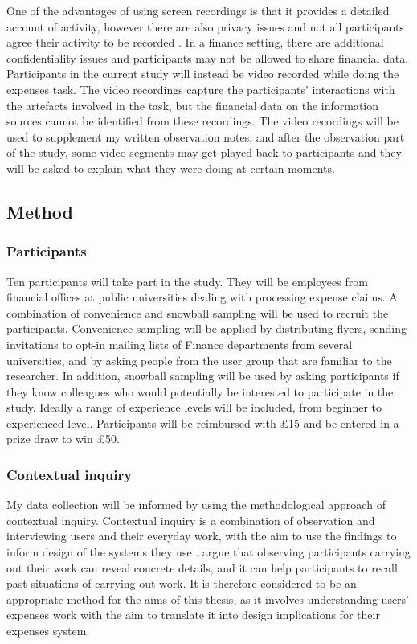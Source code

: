 \documentclass[11pt,oneside]{report}
\begin{document}
One of the advantages of using screen recordings is that it provides a detailed account of activity, however there are also privacy issues and not all participants agree their activity to be recorded \citep{Rule2015}. In a finance setting, there are additional confidentiality issues and participants may not be allowed to share financial data. Participants in the current study will instead be video recorded while doing the expenses task. The video recordings capture the participants' interactions with the artefacts involved in the task, but the financial data on the information sources cannot be identified from these recordings. The video recordings will be used to supplement my written observation notes, and after the observation part of the study, some video segments may get played back to participants and they will be asked to explain what they were doing at certain moments.

\subsection{Method}
\subsubsection{Participants}
Ten participants will take part in the study. They will be employees from financial offices at public universities dealing with processing expense claims. A combination of convenience and snowball sampling will be used to recruit the participants. Convenience sampling will be applied by distributing flyers, sending invitations to opt-in mailing lists of Finance departments from several universities, and by asking people from the user group that are familiar to the researcher. In addition, snowball sampling will be used by asking participants if they know colleagues who would potentially be interested to participate in the study. 
Ideally a range of experience levels will be included, from beginner to experienced level. Participants will be reimbursed with \pounds15 and be entered in a prize draw to win \pounds50. 

\subsubsection{Contextual inquiry}
My data collection will be informed by using the methodological approach of contextual inquiry.
Contextual inquiry is a combination of observation and interviewing users and their everyday work, with the aim to use the findings to inform design of the systems they use \citep{Beyer1998}.
\citet{Beyer1998} argue that observing participants carrying out their work can reveal concrete details, and it can help participants to recall past situations of carrying out work. It is therefore considered to be an appropriate method for the aims of this thesis, as it involves understanding users' expenses work with the aim to translate it into design implications for their expenses system. 
\end{document}
